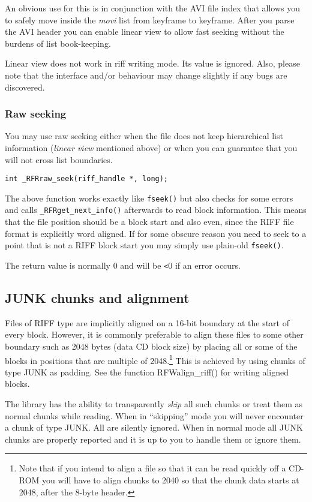 \documentclass[12pt, a4paper]{article}
\begin{document}
An obvious use for this is in conjunction with the AVI file index that allows you to
safely move inside the {\it movi} list from keyframe to keyframe. After you parse the
AVI header you can enable linear view to allow fast seeking without the burdens of
list book-keeping.

Linear view does not work in riff writing mode. Its value is ignored. Also, please
note that the interface and/or behaviour may change slightly if any bugs are
discovered. 

\subsubsection*{Raw seeking}
You may use raw seeking either when the file does not keep hierarchical
list information (\emph{linear view} mentioned above) or when you can
guarantee that you will not cross list boundaries.

\begin{verbatim}
int _RFRraw_seek(riff_handle *, long);
\end{verbatim}

The above function works exactly like 
\verb+fseek()+ but also checks for some errors and calls \verb+_RFRget_next_info()+
afterwards to read block information. This means that the file position should
be a block start and also even, since the RIFF file format is explicitly
word aligned. If for some obscure reason you need to seek to a point that
is not a RIFF block start you may simply use plain-old \verb+fseek()+. 

The return value is normally 0 and will be \verb+<+0 if an error occurs.

\subsection{JUNK chunks and alignment}
Files of RIFF type are implicitly aligned on a 16-bit boundary at the
start of every block. However,
it is commonly preferable to align these files to some other boundary such
as 2048 bytes (data CD block size) by placing all or some of the blocks
in positions that are multiple of 2048.\footnote{Note that if you intend to
align a file so that it can be read quickly off a CD-ROM you will have to
align chunks to 2040 so that the chunk data starts at 2048, after the 8-byte header.}
This is achieved by using chunks
of type JUNK as padding. See the function RFWalign\_riff() for writing aligned
blocks.

The \libriff{} library has the ability to transparently \emph{skip} all
such chunks or treat them as normal chunks while reading. When in 
``skipping'' mode you will never encounter a chunk of type JUNK.
All are silently ignored. When in normal mode all JUNK chunks are 
properly reported and it is up to you to handle them or ignore them.
\end{document}
